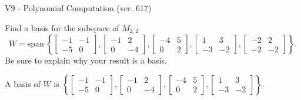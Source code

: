 \begin{exercise}
  \begin{exerciseTitle}V9 - Polynomial Computation (ver. 617)\end{exerciseTitle}
  \begin{exerciseStatement}
    Find a basis for the subspace of \(M_{2,2}\) 
\[W=\mathrm{span}\ \left\{\left[\begin{array}{cc}
-1 & -1 \\
-5 & 0
\end{array}\right] , \left[\begin{array}{cc}
-1 & 2 \\
0 & -4
\end{array}\right] , \left[\begin{array}{cc}
-4 & 5 \\
0 & 2
\end{array}\right] , \left[\begin{array}{cc}
1 & 3 \\
-3 & -2
\end{array}\right] , \left[\begin{array}{cc}
-2 & 2 \\
-2 & -2
\end{array}\right]\right\}.\]
 Be sure to explain why your result is a basis.


  \end{exerciseStatement}
  \begin{exerciseAnswer}
   A basis of \(W\) is  \(\left\{\left[\begin{array}{cc}
-1 & -1 \\
-5 & 0
\end{array}\right] , \left[\begin{array}{cc}
-1 & 2 \\
0 & -4
\end{array}\right] , \left[\begin{array}{cc}
-4 & 5 \\
0 & 2
\end{array}\right] , \left[\begin{array}{cc}
1 & 3 \\
-3 & -2
\end{array}\right]\right\}\).
  


  \end{exerciseAnswer}
\end{exercise}